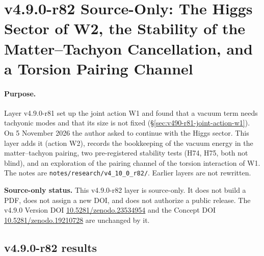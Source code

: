 
\clearpage
\section*{v4.9.0-r82 Source-Only: The Higgs Sector of W2, the Stability of the Matter--Tachyon Cancellation, and a Torsion Pairing Channel}
\label{sec:v490-r82-higgs-stability}

\paragraph{Purpose.}
Layer v4.9.0-r81 set up the joint action W1 and found that a vacuum term needs tachyonic modes and that its size is not fixed
(\S\ref{sec:v490-r81-joint-action-w1}).  On 5 November 2026 the author asked to continue with the Higgs sector.  This layer adds it
(action W2), records the bookkeeping of the vacuum energy in the matter--tachyon pairing, two pre-registered stability tests (H74,
H75, both not blind), and an exploration of the pairing channel of the torsion interaction of W1.  The notes are
\texttt{notes/\allowbreak research/\allowbreak v4\_10\_0\_r82/}.  Earlier layers are not rewritten.

\noindent\textbf{Source-only status.}
This v4.9.0-r82 layer is source-only.  It does not build a PDF, does not assign a new DOI,
and does not authorize a public release.  The v4.9.0 Version DOI
\href{https://doi.org/10.5281/zenodo.23534954}{10.5281/zenodo.23534954} and the Concept DOI
\href{https://doi.org/10.5281/zenodo.19210728}{10.5281/zenodo.19210728} are unchanged by it.

\subsection*{v4.9.0-r82 results}
\label{subsec:v490-r82-results}

